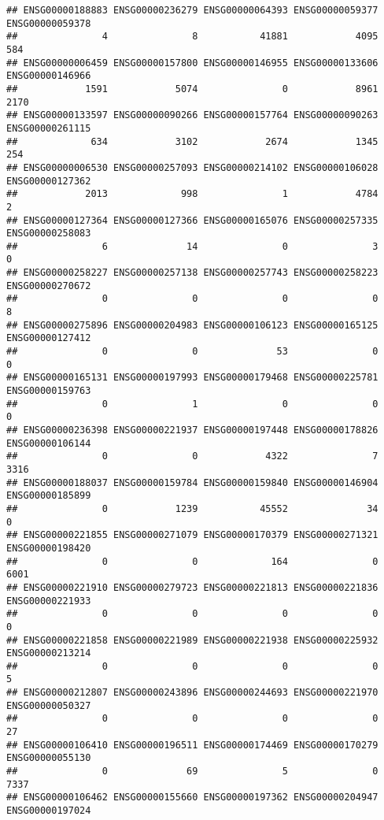\documentclass[
]{article}
\begin{document}
\begin{verbatim}
## ENSG00000188883 ENSG00000236279 ENSG00000064393 ENSG00000059377 ENSG00000059378 
##               4               8           41881            4095             584 
## ENSG00000006459 ENSG00000157800 ENSG00000146955 ENSG00000133606 ENSG00000146966 
##            1591            5074               0            8961            2170 
## ENSG00000133597 ENSG00000090266 ENSG00000157764 ENSG00000090263 ENSG00000261115 
##             634            3102            2674            1345             254 
## ENSG00000006530 ENSG00000257093 ENSG00000214102 ENSG00000106028 ENSG00000127362 
##            2013             998               1            4784               2 
## ENSG00000127364 ENSG00000127366 ENSG00000165076 ENSG00000257335 ENSG00000258083 
##               6              14               0               3               0 
## ENSG00000258227 ENSG00000257138 ENSG00000257743 ENSG00000258223 ENSG00000270672 
##               0               0               0               0               8 
## ENSG00000275896 ENSG00000204983 ENSG00000106123 ENSG00000165125 ENSG00000127412 
##               0               0              53               0               0 
## ENSG00000165131 ENSG00000197993 ENSG00000179468 ENSG00000225781 ENSG00000159763 
##               0               1               0               0               0 
## ENSG00000236398 ENSG00000221937 ENSG00000197448 ENSG00000178826 ENSG00000106144 
##               0               0            4322               7            3316 
## ENSG00000188037 ENSG00000159784 ENSG00000159840 ENSG00000146904 ENSG00000185899 
##               0            1239           45552              34               0 
## ENSG00000221855 ENSG00000271079 ENSG00000170379 ENSG00000271321 ENSG00000198420 
##               0               0             164               0            6001 
## ENSG00000221910 ENSG00000279723 ENSG00000221813 ENSG00000221836 ENSG00000221933 
##               0               0               0               0               0 
## ENSG00000221858 ENSG00000221989 ENSG00000221938 ENSG00000225932 ENSG00000213214 
##               0               0               0               0               5 
## ENSG00000212807 ENSG00000243896 ENSG00000244693 ENSG00000221970 ENSG00000050327 
##               0               0               0               0              27 
## ENSG00000106410 ENSG00000196511 ENSG00000174469 ENSG00000170279 ENSG00000055130 
##               0              69               5               0            7337 
## ENSG00000106462 ENSG00000155660 ENSG00000197362 ENSG00000204947 ENSG00000197024 

\end{verbatim}
\end{document}
